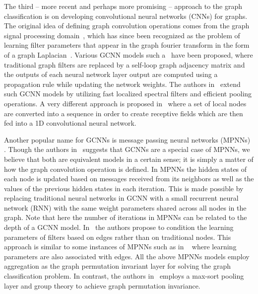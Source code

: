 \documentclass{article}
\begin{document}
The third -- more recent and perhaps more promising -- approach to the graph classification is on developing convolutional neural networks (CNNs) for graphs.  The original idea of defining graph convolution operations   comes from the graph signal processing domain~\cite{shuman2013emerging}, which  has since been recognized as the problem of learning   filter parameters that appear in the graph fourier transform in the form of a   graph Laplacian~\cite{bruna2013spectral,henaff2015deep}.  Various GCNN models such a~\cite{kipf2016semi,atwood2016diffusion, duvenaud2015convolutional} have been proposed, 
  where traditional graph filters are replaced by a self-loop graph adjacency matrix and the outputs of  each neural network layer output are computed using a propagation rule while updating the network weights.  The authors in~\cite{defferrard2016convolutional} extend such GCNN models by utilizing fast localized spectral filters and efficient  pooling operations. A very different approach is  proposed in~\cite{niepert2016learning}  where a set of  local nodes are converted into a  sequence in order to  create receptive fields which are then   fed into a 1D convolutional neural network.

Another popular name for GCNNs is message passing neural networks (MPNNs)~\cite{lei2017deriving, gilmer2017neural,dai2016discriminative, garcia2017learning} . Though the authors in~\cite{gilmer2017neural} suggests that GCNNs are a special case  of MPNNs, we believe that both are equivalent models in a certain sense; it is simply a matter of  how the graph convolution operation is defined. In MPNNs the  hidden states of each node  is updated based on messages received from its neighbors as well as  the values of the previous hidden states in each iteration.  This is made possible    by replacing traditional neural networks in GCNN with a small recurrent neural network (RNN) with the same weight parameters shared across all nodes in the graph. Note that here the number of iterations in MPNNs can be related to the depth of a GCNN model. In~\cite{simonovsky2017dynamic} the  authors propose to condition the learning parameters of filters  based on edges rather than on traditional nodes. This approach is similar to some instances of MPNNs such as in ~\cite{gilmer2017neural} where learning parameters are also associated with  edges. All the above MPNNs models employ aggregation   as the graph permutation invariant layer for solving the graph classification problem. In contrast, the authors  in~\cite{zhang2018end, kondor2018covariant} employs a max-sort pooling layer and group theory to achieve graph permutation invariance. 
\end{document}
